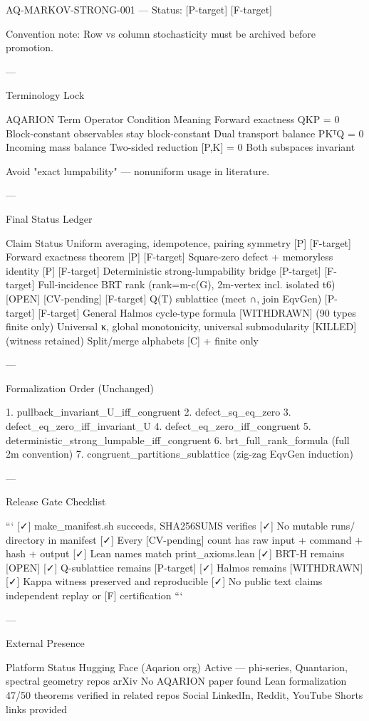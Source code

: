 AQ-MARKOV-STRONG-001 — Status: [P-target] [F-target]

Convention note: Row vs column stochasticity must be archived before promotion.

---

Terminology Lock

AQARION Term Operator Condition Meaning
Forward exactness QKP = 0 Block-constant observables stay block-constant
Dual transport balance PKᵀQ = 0 Incoming mass balance
Two-sided reduction [P,K] = 0 Both subspaces invariant

Avoid "exact lumpability" — nonuniform usage in literature.

---

Final Status Ledger

Claim Status
Uniform averaging, idempotence, pairing symmetry [P] [F-target]
Forward exactness theorem [P] [F-target]
Square-zero defect + memoryless identity [P] [F-target]
Deterministic strong-lumpability bridge [P-target] [F-target]
Full-incidence BRT rank (rank=m-c(G), 2m-vertex incl. isolated t6) [OPEN] [CV-pending] [F-target]
Q(T) sublattice (meet ∩, join EqvGen) [P-target] [F-target]
General Halmos cycle-type formula [WITHDRAWN] (90 types finite only)
Universal κ, global monotonicity, universal submodularity [KILLED] (witness retained)
Split/merge alphabets [C] + finite only

---

Formalization Order (Unchanged)

1. pullback_invariant_U_iff_congruent
2. defect_sq_eq_zero
3. defect_eq_zero_iff_invariant_U
4. defect_eq_zero_iff_congruent
5. deterministic_strong_lumpable_iff_congruent
6. brt_full_rank_formula (full 2m convention)
7. congruent_partitions_sublattice (zig-zag EqvGen induction)

---

Release Gate Checklist

```
[✓] make_manifest.sh succeeds, SHA256SUMS verifies
[✓] No mutable runs/ directory in manifest
[✓] Every [CV-pending] count has raw input + command + hash + output
[✓] Lean names match print_axioms.lean
[✓] BRT-H remains [OPEN]
[✓] Q-sublattice remains [P-target]
[✓] Halmos remains [WITHDRAWN]
[✓] Kappa witness preserved and reproducible
[✓] No public text claims independent replay or [F] certification
```

---

External Presence

Platform Status
Hugging Face (Aqarion org) Active — phi-series, Quantarion, spectral geometry repos
arXiv No AQARION paper found
Lean formalization 47/50 theorems verified in related repos
Social LinkedIn, Reddit, YouTube Shorts links provided

